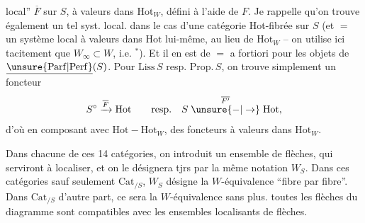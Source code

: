 local'' $\overline F$ sur $S$, à valeurs dans $\mathrm{Hot}_W$, défini à
l'aide de $F$. Je rappelle qu'on trouve également
un tel syst. local. dans le cas d'une catégorie
Hot-fibrée sur $S$ (et $=$ un système local
à valeurs dans $\mathrm{Hot}$ \unsure{\}} lui-même, au lieu de
$\mathrm{Hot}_W$ \unsure{\}} -- on utilise ici tacitement que
$W_\infty\subset W$, i.e. $^*$).
Et il en est de $=$ a fortiori pour les objets de
$\underline{\unsure{\mathrm{Parf}|\mathrm{Perf}}}(S)$. Pour $\mathrm{Liss}\,S$ resp. $\mathrm{Prop}.\,S$, on
trouve simplement un foncteur
\[
S^\circ\xrightarrow{\overline F}\mathrm{Hot}\qquad\text{resp.}\quad S\mathrel{\overset{\overline{F'}}{\unsure{-|\to}}}\mathrm{Hot},
\]
d'où en composant avec $\mathrm{Hot}\mathrel{-}\mathrm{Hot}_W$, des
foncteurs à valeurs dans $\mathrm{Hot}_W$.

Dans chacune de ces 14 catégories, on
introduit un ensemble de flèches, qui
serviront à localiser, et on le désignera tjrs
par la même notation $W_S$. Dans 
ces catégories sauf seulement $\mathrm{Cat}_{/S}$, 
$W_S$ désigne la $W$-équivalence ``fibre par fibre''.
Dans $\mathrm{Cat}_{/S}$ d'autre part, ce sera la
$W$-équivalence sans plus. toutes les flèches
du diagramme  sont compatibles avec les
ensembles localisants de flèches.
